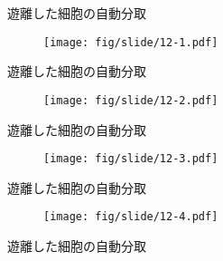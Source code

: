 \begin{frame}{遊離した細胞の自動分取}
    \begin{figure}[t]
        \centering
        \texttt{[image: fig/slide/12-1.pdf]}
    \end{figure}
\end{frame}
\begin{frame}[noframenumbering]{遊離した細胞の自動分取}
    \begin{figure}[t]
        \centering
        \texttt{[image: fig/slide/12-2.pdf]}
    \end{figure}
\end{frame}
\begin{frame}[noframenumbering]{遊離した細胞の自動分取}
    \begin{figure}[t]
        \centering
        \texttt{[image: fig/slide/12-3.pdf]}
    \end{figure}
\end{frame}
\begin{frame}[noframenumbering]{遊離した細胞の自動分取}
    \begin{figure}[t]
        \centering
        \texttt{[image: fig/slide/12-4.pdf]}
    \end{figure}
\end{frame}
\begin{frame}[noframenumbering]{遊離した細胞の自動分取}
    \begin{figure}
    \end{figure}
\end{frame}
